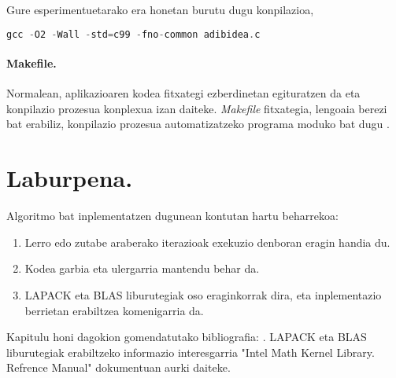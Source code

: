 Gure esperimentuetarako era honetan burutu dugu konpilazioa,
\begin{lstlisting}[language=C]
gcc -O2 -Wall -std=c99 -fno-common adibidea.c
\end{lstlisting}

\paragraph*{Makefile.}

Normalean, aplikazioaren kodea fitxategi ezberdinetan egituratzen da eta konpilazio prozesua konplexua izan daiteke. \emph{Makefile} fitxategia, lengoaia berezi bat erabiliz, konpilazio prozesua automatizatzeko programa moduko bat dugu \cite{EijkhoutHPC}. 

\section{Laburpena.}

Algoritmo bat inplementatzen dugunean kontutan hartu beharrekoa:

\begin{enumerate}

\item Lerro edo zutabe araberako iterazioak exekuzio denboran eragin handia du.

\item Kodea garbia eta ulergarria mantendu behar da.

\item LAPACK eta BLAS liburutegiak oso eraginkorrak dira, eta inplementazio berrietan erabiltzea komenigarria da.


\end{enumerate}

Kapitulu honi dagokion gomendatutako bibliografia: \cite{Pacheco2011,EijkhoutHPC,Goedecker2001,Hogben2013}.
LAPACK eta BLAS liburutegiak erabiltzeko informazio interesgarria "Intel Math Kernel Library. Refrence Manual" \cite{Intel2015} dokumentuan aurki daiteke.
